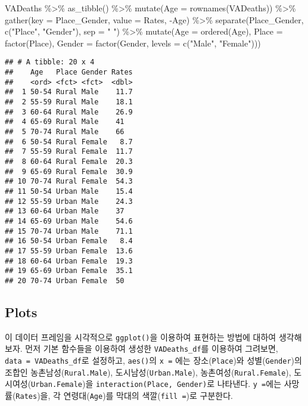 \documentclass[
]{article}
\newenvironment{Shaded}{\begin{snugshade}}{\end{snugshade}}
\newcommand{\AttributeTok}[1]{\textcolor[rgb]{0.77,0.63,0.00}{#1}}
\newcommand{\FunctionTok}[1]{\textcolor[rgb]{0.00,0.00,0.00}{#1}}
\newcommand{\NormalTok}[1]{#1}
\newcommand{\SpecialCharTok}[1]{\textcolor[rgb]{0.00,0.00,0.00}{#1}}
\newcommand{\StringTok}[1]{\textcolor[rgb]{0.31,0.60,0.02}{#1}}
\begin{document}
\begin{Shaded}
\begin{Highlighting}[]
\NormalTok{VADeaths }\SpecialCharTok{\%\textgreater{}\%}
  \FunctionTok{as\_tibble}\NormalTok{() }\SpecialCharTok{\%\textgreater{}\%}
  \FunctionTok{mutate}\NormalTok{(}\AttributeTok{Age =} \FunctionTok{rownames}\NormalTok{(VADeaths)) }\SpecialCharTok{\%\textgreater{}\%}
  \FunctionTok{gather}\NormalTok{(}\AttributeTok{key =}\NormalTok{ Place\_Gender, }
         \AttributeTok{value =}\NormalTok{ Rates,}
         \SpecialCharTok{{-}}\NormalTok{Age) }\SpecialCharTok{\%\textgreater{}\%}
  \FunctionTok{separate}\NormalTok{(Place\_Gender, }\FunctionTok{c}\NormalTok{(}\StringTok{"Place"}\NormalTok{, }\StringTok{"Gender"}\NormalTok{), }
           \AttributeTok{sep =} \StringTok{" "}\NormalTok{) }\SpecialCharTok{\%\textgreater{}\%}
  \FunctionTok{mutate}\NormalTok{(}\AttributeTok{Age =} \FunctionTok{ordered}\NormalTok{(Age),}
         \AttributeTok{Place =} \FunctionTok{factor}\NormalTok{(Place),}
         \AttributeTok{Gender =} \FunctionTok{factor}\NormalTok{(Gender,}
                         \AttributeTok{levels =} \FunctionTok{c}\NormalTok{(}\StringTok{"Male"}\NormalTok{, }\StringTok{"Female"}\NormalTok{))) }
\end{Highlighting}
\end{Shaded}

\begin{verbatim}
## # A tibble: 20 x 4
##    Age   Place Gender Rates
##    <ord> <fct> <fct>  <dbl>
##  1 50-54 Rural Male    11.7
##  2 55-59 Rural Male    18.1
##  3 60-64 Rural Male    26.9
##  4 65-69 Rural Male    41  
##  5 70-74 Rural Male    66  
##  6 50-54 Rural Female   8.7
##  7 55-59 Rural Female  11.7
##  8 60-64 Rural Female  20.3
##  9 65-69 Rural Female  30.9
## 10 70-74 Rural Female  54.3
## 11 50-54 Urban Male    15.4
## 12 55-59 Urban Male    24.3
## 13 60-64 Urban Male    37  
## 14 65-69 Urban Male    54.6
## 15 70-74 Urban Male    71.1
## 16 50-54 Urban Female   8.4
## 17 55-59 Urban Female  13.6
## 18 60-64 Urban Female  19.3
## 19 65-69 Urban Female  35.1
## 20 70-74 Urban Female  50
\end{verbatim}

\hypertarget{plots}{%
\subsection{Plots}\label{plots}}

이 데이터 프레임을 시각적으로 \texttt{ggplot()}을 이용하여 표현하는
방법에 대하여 생각해 보자. 먼저 기본 함수들을 이용하여 생성한
\texttt{VADeaths\_df}를 이용하여 그려보면,
\texttt{data\ =\ VADeaths\_df}로 설정하고, \texttt{aes()}의
\texttt{x\ =} 에는 장소(\texttt{Place})와 성별(\texttt{Gender})의 조합인
농촌남성(\texttt{Rural.Male}), 도시남성(\texttt{Urban.Male}),
농촌여성(\texttt{Rural.Female}), 도시여성(\texttt{Urban.Female})을
\texttt{interaction(Place,\ Gender)}로 나타낸다. \texttt{y\ =}에는
사망률(\texttt{Rates})을, 각 연령대(\texttt{Age})를 막대의
색깔(\texttt{fill\ =})로 구분한다.
\end{document}
